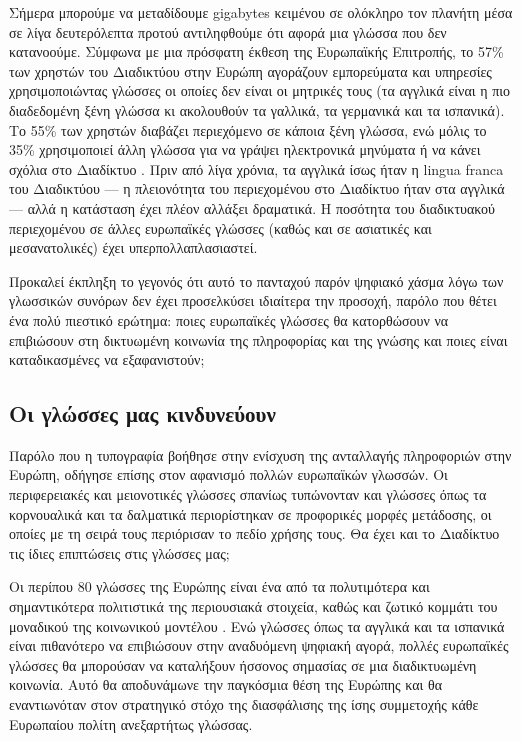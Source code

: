 \documentclass[]{../../metanetpaper}
\begin{document}
\begin{multicols}{2}

Σήμερα μπορούμε να μεταδίδουμε gigabytes κειμένου σε ολόκληρο τον πλανήτη μέσα σε λίγα δευτερόλεπτα προτού αντιληφθούμε ότι αφορά μια γλώσσα που δεν κατανοούμε. Σύμφωνα με μια πρόσφατη έκθεση της Ευρωπαϊκής Επιτροπής, το 57\% των χρηστών του Διαδικτύου στην Ευρώπη αγοράζουν εμπορεύματα και υπηρεσίες χρησιμοποιώντας γλώσσες οι οποίες δεν είναι οι μητρικές τους (τα αγγλικά είναι η πιο διαδεδομένη ξένη γλώσσα κι ακολουθούν τα γαλλικά, τα γερμανικά και τα ισπανικά). Το 55\% των χρηστών διαβάζει περιεχόμενο σε κάποια ξένη γλώσσα, ενώ μόλις το 35\% χρησιμοποιεί άλλη γλώσσα για να γράψει ηλεκτρονικά μηνύματα ή να κάνει σχόλια στο Διαδίκτυο \cite{EC1}. Πριν από λίγα χρόνια, τα αγγλικά ίσως ήταν η lingua franca του Διαδικτύου — η πλειονότητα του περιεχομένου στο Διαδίκτυο ήταν στα αγγλικά — αλλά η κατάσταση έχει πλέον αλλάξει δραματικά. Η ποσότητα του διαδικτυακού περιεχομένου σε άλλες ευρωπαϊκές  γλώσσες (καθώς και σε ασιατικές και μεσανατολικές) έχει υπερπολλαπλασιαστεί. 

Προκαλεί έκπληξη το γεγονός ότι αυτό το πανταχού παρόν ψηφιακό χάσμα λόγω των γλωσσικών συνόρων δεν έχει προσελκύσει ιδιαίτερα την προσοχή,  παρόλο που θέτει ένα πολύ πιεστικό ερώτημα: ποιες ευρωπαϊκές γλώσσες θα κατορθώσουν να επιβιώσουν στη δικτυωμένη κοινωνία της πληροφορίας και της γνώσης και ποιες είναι καταδικασμένες να εξαφανιστούν;

\subsection{Οι γλώσσες μας κινδυνεύουν}

Παρόλο που η τυπογραφία βοήθησε στην ενίσχυση της ανταλλαγής πληροφοριών στην Ευρώπη, οδήγησε επίσης στον αφανισμό πολλών ευρωπαϊκών γλωσσών. Οι περιφερειακές και μειονοτικές γλώσσες σπανίως τυπώνονταν και γλώσσες όπως τα κορνουαλικά και τα δαλματικά περιορίστηκαν σε προφορικές μορφές μετάδοσης, οι οποίες με τη σειρά τους περιόρισαν το πεδίο χρήσης τους. Θα έχει και το Διαδίκτυο τις ίδιες επιπτώσεις στις γλώσσες μας;

Οι περίπου 80 γλώσσες της Ευρώπης είναι ένα από τα πολυτιμότερα και σημαντικότερα πολιτιστικά της περιουσιακά στοιχεία, καθώς και ζωτικό κομμάτι του μοναδικού της κοινωνικού μοντέλου \cite{EC2}. Ενώ γλώσσες όπως τα αγγλικά και τα ισπανικά είναι πιθανότερο να επιβιώσουν στην αναδυόμενη ψηφιακή αγορά, πολλές ευρωπαϊκές γλώσσες θα μπορούσαν να καταλήξουν ήσσονος σημασίας σε μια διαδικτυωμένη κοινωνία. Αυτό θα αποδυνάμωνε την παγκόσμια θέση της Ευρώπης και θα εναντιωνόταν  στον στρατηγικό στόχο της διασφάλισης της ίσης συμμετοχής κάθε Ευρωπαίου πολίτη ανεξαρτήτως γλώσσας.


\end{multicols}
\end{document}
